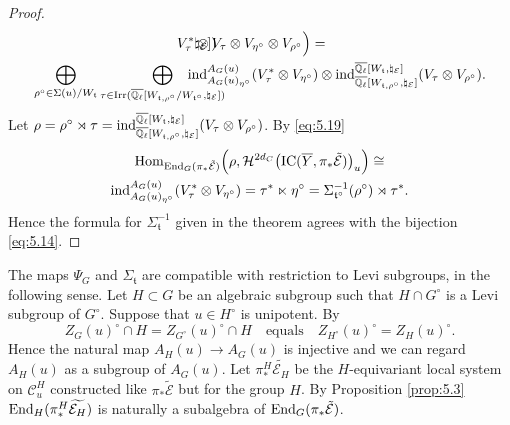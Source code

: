 \documentclass[11pt]{amsart}
\theoremstyle{definition}
\newcommand{\Q}{\mathbb Q}
\def\Hom{{\rm Hom}}
\def\End{{\rm End}}
\def\Irr{{\rm Irr}}
\def\cC{{\mathcal C}}
\def\cH{{\mathcal H}}
\def\cE{{\mathcal E}}
\def\ind{{\rm ind}}
\def\ft{{\mathfrak t}}
\def\IC{{\rm{IC}}}
\begin{document}
\begin{proof}
\begin{multline}
{\natural_\cE])} \hspace{-1cm} V_\tau^* \otimes V_\tau \otimes V_{\eta^\circ} \otimes 
V_{\rho^\circ} \Big) = \\
\bigoplus_{\rho^\circ \in \Sigma (u) / W_\ft} \bigoplus_{\tau \in \Irr 
(\overline{\Q_{\ell}} [W_{\ft,\rho^\circ} / W_{\ft^\circ},\natural_\cE])} \hspace{-1cm} 
\ind_{A_G (u)_{\eta^\circ}}^{A_G (u)} (V_\tau^* \otimes V_{\eta^\circ}) \otimes
\ind_{\overline{\Q_{\ell}}[W_{\ft,\rho^\circ},\natural_\cE]}^{\overline{\Q_{\ell}}
[W_\ft,\natural_\cE]} (V_\tau \otimes V_{\rho^\circ}) .
\end{multline}
Let $\rho = \rho^\circ \rtimes \tau = \ind_{\overline{\Q_{\ell}}[W_{\ft,\rho^\circ},
\natural_\cE]}^{\overline{\Q_{\ell}} [W_\ft,\natural_\cE]} (V_\tau \otimes V_{\rho^\circ})$.
By \eqref{eq:5.19} 
\begin{multline*}
\Hom_{\End_G (\pi_* \tilde{\cE})} \Big( \rho, \cH^{2d_C} \big( 
\IC (\overline{Y},\pi_* \tilde{\cE}) \big)_u \Big) \cong \\
\ind_{A_G (u)_{\eta^\circ}}^{A_G (u)} (V_\tau^* \otimes V_{\eta^\circ}) =
\tau^* \ltimes \eta^\circ = \Sigma_{\ft^\circ}^{-1}(\rho^\circ) \rtimes \tau^*.
\end{multline*}
Hence the formula for $\Sigma_\ft^{-1}$ given in the theorem agrees with
the bijection \eqref{eq:5.14}.
\end{proof}

The maps $\Psi_G$ and $\Sigma_\ft$ are compatible with restriction to Levi
subgroups, in the following sense. Let $H \subset G$ be an algebraic subgroup
such that $H \cap G^\circ$ is a Levi subgroup of $G^\circ$. Suppose that
$u \in H^\circ$ is unipotent. By \cite[\S 3.2]{Ree1} 
\begin{equation}\label{eq:5.23}
Z_G (u)^\circ \cap H = Z_{G^\circ}(u)^\circ \cap H \quad \text{equals} \quad
Z_{H^\circ}(u)^\circ = Z_H (u)^\circ .
\end{equation}
Hence the natural map $A_H (u) \to A_G (u)$ is injective and we can regard
$A_H (u)$ as a subgroup of $A_G (u)$. Let $\pi_*^H \widetilde{\cE_H}$ be the
$H$-equivariant local system on $\cC_u^H$ constructed like $\pi_* \tilde{\cE}$ but
for the group $H$. By Proposition \ref{prop:5.3} $\End_H (\pi_*^H \widetilde{\cE_H})$
is naturally a subalgebra of $\End_G (\pi_* \tilde{\cE})$.
\end{document}
